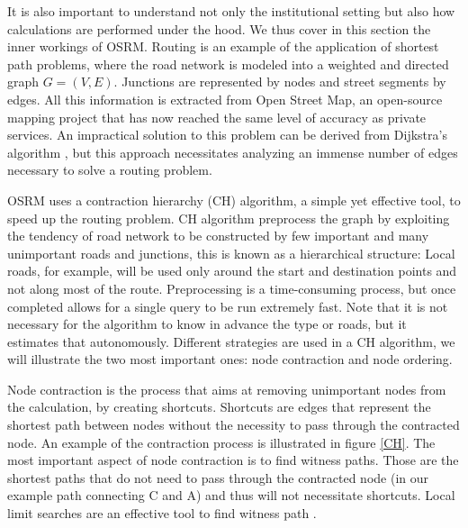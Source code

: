 \documentclass[12pt]{article}
\begin{document}
It is also important to understand not only the institutional setting but also how calculations are performed under the hood. We thus cover in this section the inner workings of OSRM. Routing is an example of the application of shortest path problems, where the road network is modeled into a weighted and directed graph $G = (V,E)$. Junctions are represented by nodes and street segments by edges. All this information is extracted from Open Street Map, an open-source mapping project that has now reached the same level of accuracy as private services.  An impractical solution to this problem can be derived from Dijkstra's algorithm \parencite{algo}, but this approach necessitates analyzing an immense number of edges necessary to solve a routing problem. 

OSRM uses a contraction hierarchy (CH) algorithm, a simple yet effective tool, to speed up the routing problem. CH algorithm preprocess the graph by exploiting the tendency of road network to be constructed by few important and many unimportant roads and junctions, this is known as a hierarchical structure: Local roads, for example, will be used only around the start and destination points and not along most of the route. Preprocessing is a time-consuming process, but once completed allows for a single query to be run extremely fast. Note that it is not necessary for the algorithm to know in advance the type or roads, but it estimates that autonomously. Different strategies are used in a CH algorithm, we will illustrate the two most important ones: node contraction and node ordering.

Node contraction is the process that aims at removing unimportant nodes from the calculation, by creating shortcuts. Shortcuts are edges that represent the shortest path between nodes without the necessity to pass through the contracted node. An example of the contraction process is illustrated in figure \ref{CH}. The most important aspect of node contraction is to find witness paths. Those are the shortest paths that do not need to pass through the contracted node (in our example path connecting C and A) and thus will not necessitate shortcuts. Local limit searches are an effective tool to find witness path \parencite{Geisberger2012}.
\end{document}
